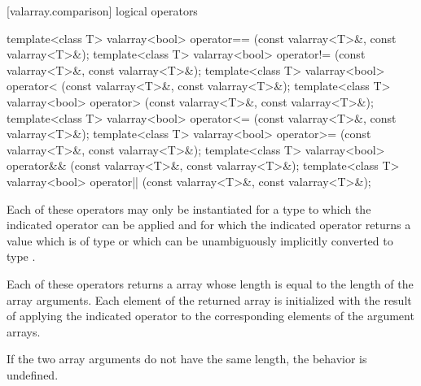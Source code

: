 [valarray.comparison]{ logical operators}

%
%
%
%
%
%
%
%
\begin{itemdecl}
template<class T> valarray<bool> operator==
    (const valarray<T>&, const valarray<T>&);
template<class T> valarray<bool> operator!=
    (const valarray<T>&, const valarray<T>&);
template<class T> valarray<bool> operator<
    (const valarray<T>&, const valarray<T>&);
template<class T> valarray<bool> operator>
    (const valarray<T>&, const valarray<T>&);
template<class T> valarray<bool> operator<=
    (const valarray<T>&, const valarray<T>&);
template<class T> valarray<bool> operator>=
    (const valarray<T>&, const valarray<T>&);
template<class T> valarray<bool> operator&&
    (const valarray<T>&, const valarray<T>&);
template<class T> valarray<bool> operator||
    (const valarray<T>&, const valarray<T>&);
\end{itemdecl}

\begin{itemdescr}
\pnum
Each of these operators may only be instantiated for a type 
to which the indicated operator can be applied and for which
the indicated operator returns a value which is of type 
or which can be unambiguously implicitly converted to type .

\pnum
Each of these operators returns a  array whose length
is equal to the length of the array arguments.
Each element of the returned
array is initialized with the result of applying the indicated
operator to the corresponding elements of the argument arrays.

\pnum
If the two array arguments do not have the same length,
the behavior is undefined.%
\end{itemdescr}


